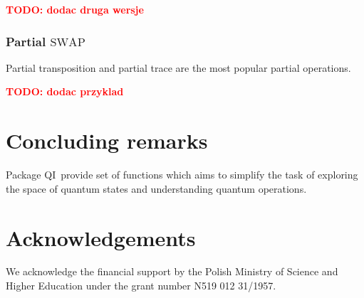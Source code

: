 \documentclass[final,5p,times]{elsarticle}
\newcommand{\1}{{\rm 1\hspace{-0.9mm}l}}
\newcommand{\SWAP}{\ensuremath{\mathrm{SWAP}}}
\newcommand{\qi}{QI}
\newcommand{\todo}[1]{\textcolor{red}{\bf TODO: #1}}
\begin{document}
\todo{dodac druga wersje}

\subsubsection{Partial \SWAP}
Partial transposition and partial trace are the most popular partial operations.

\todo{dodac przyklad}

\section{Concluding remarks}\label{sec:comclude}
Package \qi\ provide set of functions which aims to simplify the task of
exploring the space of quantum states and understanding quantum operations.

\section*{Acknowledgements}
We acknowledge the financial support by the Polish
Ministry of Science and Higher Education under the grant number N519 012
31/1957. 



\end{document}
